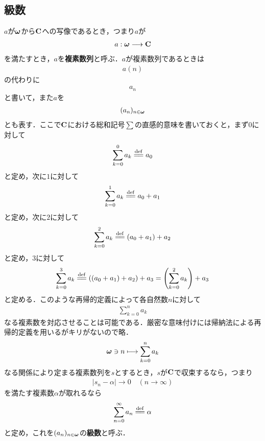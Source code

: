 \subsection{級数}
	
	$a$が${\boldsymbol \omega}$から$\mathbf{C}$への写像であるとき，つまり$a$が
	\begin{align}
		a: {\boldsymbol \omega} \longrightarrow \mathbf{C}
	\end{align}
	を満たすとき，$a$を{\bf 複素数列}と呼ぶ．$a$が複素数列であるときは
	\begin{align}
		a(n)
	\end{align}
	の代わりに
	\begin{align}
		a_n
	\end{align}
	と書いて，また$a$を
	\begin{align}
		(a_n)_{n \in {\boldsymbol \omega}}
	\end{align}
	とも表す．ここで$\mathbf{C}$における総和記号$\sum$の直感的意味を書いておくと，まず$0$に対して
	\begin{align}
		\sum_{k=0}^0 a_k \defeq a_0
	\end{align}
	と定め，次に$1$に対して
	\begin{align}
		\sum_{k=0}^1 a_k \defeq a_0 + a_1
	\end{align}
	と定め，次に$2$に対して
	\begin{align}
		\sum_{k=0}^2 a_k \defeq (a_0 + a_1) + a_2
	\end{align}
	と定め，$3$に対して
	\begin{align}
		\sum_{k=0}^3 a_k \defeq ((a_0 + a_1) + a_2) + a_3 = \left(\sum_{k=0}^2 a_k\right) + a_3
	\end{align}
	と定める．このような再帰的定義によって各自然数$n$に対して
	\begin{align}
		\sum_{k=0}^n a_k
	\end{align}
	なる複素数を対応させることは可能である．厳密な意味付けには帰納法による再帰的定義を用いるがキリがないので略．
	\begin{align}
		{\boldsymbol \omega} \ni n \longmapsto \sum_{k=0}^n a_k
	\end{align}
	なる関係により定まる複素数列を$s$とするとき，$s$が$\mathbf{C}$で収束するなら，つまり
	\begin{align}
		|s_n - \alpha| \longrightarrow 0\quad (n \longrightarrow \infty)
	\end{align}
	を満たす複素数$\alpha$が取れるなら
	\begin{align}
		\sum_{n=0}^\infty a_n \defeq \alpha
	\end{align}
	と定め，これを$(a_n)_{n \in {\boldsymbol \omega}}$の{\bf 級数}と呼ぶ．
